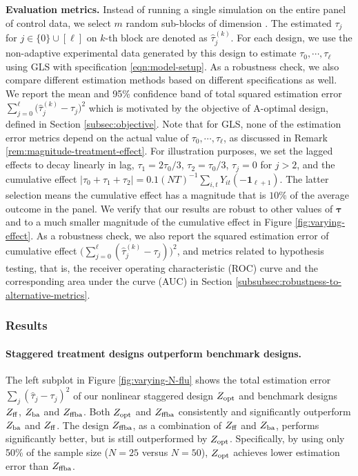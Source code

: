 	{\bf Evaluation metrics.} Instead of running a single simulation on the entire panel of control data, we select $m$ random sub-blocks of dimension . The estimated $\tau_j$ for $j \in \{0\}  \cup [\ell]$ on $k$-th block are denoted as $\hat \tau^{(k)}_{j} $. 
 For each design, we use the non-adaptive experimental data generated by this design to estimate $\tau_0, \cdots, \tau_\ell$ using GLS with specification \eqref{eqn:model-setup}. 
	As a robustness check, we also compare different estimation methods based on different specifications as well.
	We report the mean and 95\% confidence band of total squared estimation error $\sum_{j = 0}^{\ell} \big( \hat \tau^{(k)}_{j} - \tau_j \big)^2$ which is motivated by the objective of A-optimal design, defined in Section \ref{subsec:objective}. {\blue Note that for GLS, none of the estimation error metrics depend on the actual value of $\tau_0, \cdots, \tau_\ell$, as discussed in Remark \ref{rem:magnitude-treatment-effect}. For illustration purposes, we set the lagged effects to decay linearly in lag, $\tau_{1} = 2 \tau_{0}/3$,  $\tau_{2} =  \tau_{0}/3$, $\tau_j = 0$ for $j > 2$, and the cumulative effect $|\tau_0 + \tau_1 + \tau_2| = 0.1(NT)^{-1}\sum_{i,t} Y_{it}(-\bm{1}_{\ell+1})$. The latter selection means the cumulative effect has a magnitude that is $10\%$ of the average outcome in the panel. We verify that our results are robust to other values of $\bm{\tau}$ and to a much smaller magnitude of the cumulative effect in Figure \ref{fig:varying-effect}. } As a robustness check, we also report the squared estimation error of cumulative effect $\big(\sum_{j = 0}^{\ell} (\hat \tau^{(k)}_{j} - \tau_j) \big)^2$, and metrics related to hypothesis testing, that is, the receiver operating characteristic (ROC) curve and the corresponding area under the curve (AUC) in Section \ref{subsubsec:robustness-to-alternative-metrics}.
	
\subsubsection{Results}\label{subsec:fixed-sample-empirical-results}
	
	
	\paragraph{Staggered treatment designs outperform benchmark designs.} The left subplot in Figure \ref{fig:varying-N-flu} shows the total estimation error $\sum_{j}(\hat{\tau}_j - \tau_j)^2$ of our nonlinear staggered design $Z_{\textnormal{opt}}$ and benchmark designs $Z_{\mathrm{ff}}$, $Z_{\mathrm{ba}}$ and $Z_{\mathrm{ffba}}$. Both $Z_{\textnormal{opt}}$ and $Z_{\mathrm{ffba}}$ consistently and significantly outperform $Z_{\mathrm{ba}}$ and $Z_{\mathrm{ff}}$. 
	The design $Z_{\mathrm{ffba}}$, as a combination of $Z_{\mathrm{ff}}$ and $Z_{\mathrm{ba}}$, performs significantly better, but is still outperformed by $Z_{\textnormal{opt}}$. Specifically, by using only 50\% of the sample size ($N=25$ versus $N=50$), $Z_{\textnormal{opt}}$ achieves lower estimation error than $Z_{\mathrm{ffba}}$. 
	




